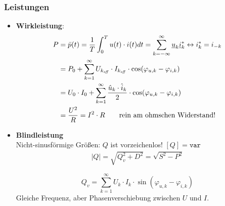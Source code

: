\begin{multicols*}{2}
\subsubsection{Leistungen}
\begin{itemize}  
	\item \textbf{Wirkleistung}:
\begin{align*}
			      P & = \bar{p}(t) = \frac{1}{T} \int_0^T u(t)\cdot i(t) dt
     		       = \sum_{k=-\infty}^{\infty}\underline{u}_k \underline{i}_k^* \leftrightarrow i_k^* = i_{-k}\\
     		       &= 
  			      P_0 + \sum_{k=1}^{\infty} U_{k_{\mathit{eff}}}\cdot
     		       I_{k_{\mathit{eff}}}\cdot\cos(\varphi_{u,k}-\varphi_{i,k})\\
     		       &= U_0 \cdot I_0 + \sum_{k=1}^{\infty} \frac{\hat{u}_k\cdot \hat{i}_k}{2} \cdot \cos(\varphi_{u,k}-\varphi_{i,k})\\
     		       & = \frac{U^2}{R}= I^2 \cdot R \text{\qquad rein am ohmschen Widerstand!}
\end{align*} 
		\item \textbf{Blindleistung}\\
		{\small Nicht-sinusf\"ormige Gr\"o\ss en: $Q$ ist vorzeichenlos! $[Q]=\texttt{var}$}
		\begin{gather*}
			|Q| = \sqrt{Q^2_v + D^2} = \sqrt{S^2-P^2}
		\end{gather*}
		
	      \begin{mdframed}[style=exercise,frametitle=Verschiebungs-/Feldblindleistung $Q_v$]
	      	\[
	      	Q_v = \sum_{k=1}^{\infty} U_k \cdot I_k \cdot \sin(\varphi_{u,k}-\varphi_{i,k})
	      	\]
{\small Gleiche Frequenz, aber Phasenverschiebung zwischen $U$ und $I$.}
	      \end{mdframed}
	      

\end{itemize}
\end{multicols*}
